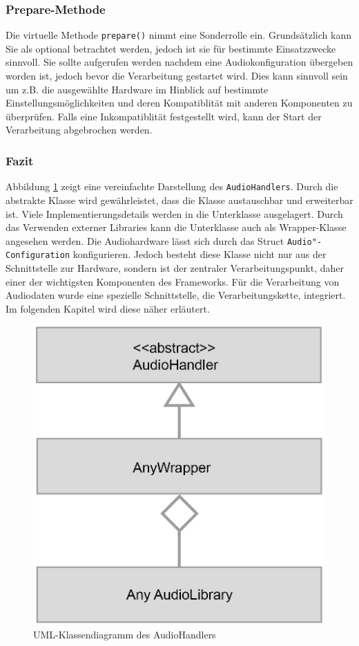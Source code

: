 \subsubsection{Prepare-Methode}
Die virtuelle Methode \texttt{prepare()} nimmt eine Sonderrolle ein. Grundsätzlich kann Sie als optional betrachtet werden, jedoch ist sie für bestimmte Einsatzzwecke sinnvoll. Sie sollte aufgerufen werden nachdem eine Audiokonfiguration übergeben worden ist, jedoch bevor die Verarbeitung gestartet wird. Dies kann sinnvoll sein um z.B. die ausgewählte Hardware im Hinblick auf bestimmte Einstellungsmöglichkeiten und deren Kompatiblität mit anderen Komponenten zu überprüfen. Falls eine Inkompatiblität festgestellt wird, kann der Start der Verarbeitung abgebrochen werden.

\FloatBarrier
\subsubsection{Fazit}
Abbildung \ref{Fig:AudioHandlerAnySimple} zeigt eine vereinfachte Darstellung des \texttt{AudioHandlers}. Durch die abstrakte Klasse wird gewährleistet, dass die Klasse austauschbar und erweiterbar ist. Viele Implementierungsdetails werden in die Unterklasse ausgelagert. Durch das Verwenden externer Libraries kann die Unterklasse auch als Wrapper-Klasse angesehen werden. Die Audiohardware lässt sich durch das Struct \texttt{Audio"-Configuration} konfigurieren. Jedoch besteht diese Klasse nicht nur aus der Schnittstelle zur Hardware, sondern ist der zentraler Verarbeitungspunkt, daher einer der wichtigsten Komponenten des Frameworks. Für die Verarbeitung von Audiodaten wurde eine spezielle Schnittstelle, die Verarbeitungskette, integriert. Im folgenden Kapitel wird diese näher erläutert.
\newline
\begin{figure}[htp]
\centering
\includegraphics[width=.45\textwidth]{../img/AudioHandlerAnySimple}
\caption{UML-Klassendiagramm des AudioHandlers}
\label{Fig:AudioHandlerAnySimple}
\end{figure}

